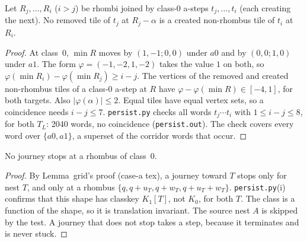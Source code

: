 \documentclass[11pt]{article}
\begin{document}
\begin{lemma}\label{lem:persist}
Let $R_j,\dots,R_i$ ($i>j$) be rhombi joined by class-0 a-steps $t_j,\dots,t_i$ (each creating the next). No removed tile of $t_j$ at $R_j-\alpha$ is a created non-rhombus tile of $t_i$ at $R_i$.
\end{lemma}
\begin{proof}
At class~0, $\min R$ moves by $(1,-1;0,0)$ under $a0$ and by $(0,0;1,0)$ under $a1$. The form $\varphi=(-1,-2,1,-2)$ takes the value $1$ on both, so $\varphi(\min R_i)-\varphi(\min R_j)\ge i-j$. The vertices of the removed and created non-rhombus tiles of a class-0 a-step at $R$ have $\varphi-\varphi(\min R)\in[-4,1]$, for both targets. Also $|\varphi(\alpha)|\le2$. Equal tiles have equal vertex sets, so a coincidence needs $i-j\le 7$. \texttt{persist.py} checks all words $t_j\cdots t_i$ with $1\le i-j\le 8$, for both $T_L$: 2040 words, no coincidence (\texttt{persist.out}). The check covers every word over $\{a0,a1\}$, a superset of the corridor words that occur.
\end{proof}

\begin{lemma}\label{lem:nostop}
No journey stops at a rhombus of class~0.
\end{lemma}
\begin{proof}
By Lemma~grid's proof (case-a tex), a journey toward $T$ stops only for nest $T$, and only at a rhombus $\{q,q+u_T,q+w_T,q+u_T+w_T\}$. \texttt{persist.py}(i) confirms that this shape has classkey $K_1[T]$, not $K_0$, for both $T$. The class is a function of the shape, so it is translation invariant. The source nest $A$ is skipped by the test. A journey that does not stop takes a step, because it terminates and is never stuck.
\end{proof}
\end{document}
